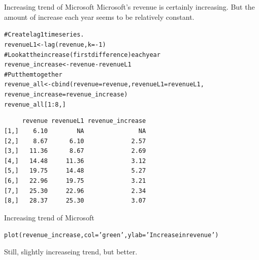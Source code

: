 \documentclass{beamer}\usepackage[]{graphicx}\usepackage[]{color}
\makeatletter
\newcommand{\hlnum}[1]{\textcolor[rgb]{0.824,0.412,0.118}{#1}}%
\newcommand{\hlstr}[1]{\textcolor[rgb]{1,0.894,0.71}{#1}}%
\newcommand{\hlcom}[1]{\textcolor[rgb]{0.824,0.706,0.549}{#1}}%
\newcommand{\hlopt}[1]{\textcolor[rgb]{1,0.894,0.769}{#1}}%
\newcommand{\hlstd}[1]{\textcolor[rgb]{1,0.894,0.769}{#1}}%
\newcommand{\hlkwb}[1]{\textcolor[rgb]{0.804,0.776,0.451}{#1}}%
\newcommand{\hlkwc}[1]{\textcolor[rgb]{0.78,0.941,0.545}{#1}}%
\newcommand{\hlkwd}[1]{\textcolor[rgb]{1,0.78,0.769}{#1}}%
\newenvironment{kframe}{%
 \def\at@end@of@kframe{}%
 \ifinner\ifhmode%
  \def\at@end@of@kframe{\end{minipage}}%
  \begin{minipage}{\columnwidth}%
 \fi\fi%
 \def\FrameCommand##1{\hskip\@totalleftmargin \hskip-\fboxsep
 \colorbox{shadecolor}{##1}\hskip-\fboxsep
     \hskip-\linewidth \hskip-\@totalleftmargin \hskip\columnwidth}%
 \MakeFramed {\advance\hsize-\width
   \@totalleftmargin\z@ \linewidth\hsize
   \@setminipage}}%
 {\par\unskip\endMakeFramed%
 \at@end@of@kframe}
\newenvironment{knitrout}{}{} %
\makeatother
\begin{document}
\begin{darkframes}
    
    \begin{frame}[fragile]{Increasing trend of Microsoft}
    \fontsize{9}{9}\selectfont
      Microsoft's revenue is certainly increasing. But the amount of increase each year seems to be relatively constant.
\begin{knitrout}
\begin{kframe}
\begin{alltt}
\hlcom{# Create lag 1 time series.}
\hlstd{revenueL1} \hlkwb{<-} \hlkwd{lag}\hlstd{(revenue,} \hlkwc{k}\hlstd{=}\hlopt{-}\hlnum{1}\hlstd{)}
\hlcom{# Look at the increase (first difference) each year}
\hlstd{revenue_increase} \hlkwb{<-} \hlstd{revenue} \hlopt{-} \hlstd{revenueL1}
\hlcom{# Put them together}
\hlstd{revenue_all} \hlkwb{<-} \hlkwd{cbind}\hlstd{(}\hlkwc{revenue}\hlstd{=revenue,} \hlkwc{revenueL1}\hlstd{=revenueL1,}
                     \hlkwc{revenue_increase}\hlstd{=revenue_increase)}
\hlstd{revenue_all[}\hlnum{1}\hlopt{:}\hlnum{8}\hlstd{,]}
\end{alltt}
\begin{verbatim}
     revenue revenueL1 revenue_increase
[1,]    6.10        NA               NA
[2,]    8.67      6.10             2.57
[3,]   11.36      8.67             2.69
[4,]   14.48     11.36             3.12
[5,]   19.75     14.48             5.27
[6,]   22.96     19.75             3.21
[7,]   25.30     22.96             2.34
[8,]   28.37     25.30             3.07
\end{verbatim}
\end{kframe}
\end{knitrout}
    \end{frame}
    
    \begin{frame}[fragile]{Increasing trend of Microsoft}
      \fontsize{9}{9}\selectfont
\begin{knitrout}
\begin{kframe}
\begin{alltt}
\hlkwd{plot}\hlstd{(revenue_increase,} \hlkwc{col}\hlstd{=}\hlstr{'green'}\hlstd{,} \hlkwc{ylab}\hlstd{=}\hlstr{'Increase in revenue'}\hlstd{)}
\end{alltt}
\end{kframe}


\end{knitrout}
    
    \pause
    Still, slightly increaseing trend, but better.   
    \end{frame}
    

\end{darkframes}
\end{document}
